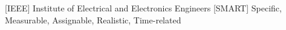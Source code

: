  [IEEE] {Institute of Electrical and Electronics Engineers}
 [SMART] {Specific, Measurable, Assignable, Realistic, Time-related}
